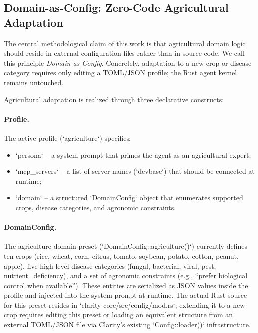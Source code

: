 \documentclass[11pt,a4paper]{article}
\begin{document}
\subsection{Domain-as-Config: Zero-Code Agricultural Adaptation}

The central methodological claim of this work is that agricultural domain logic should reside in external configuration files rather than in source code. We call this principle \textit{Domain-as-Config}. Concretely, adaptation to a new crop or disease category requires only editing a TOML/JSON profile; the Rust agent kernel remains untouched.

Agricultural adaptation is realized through three declarative constructs:

\paragraph{Profile.} The active profile (`agriculture`) specifies:
\begin{itemize}[leftmargin=*]
    \item `persona` -- a system prompt that primes the agent as an agricultural expert;
    \item `mcp\_servers` -- a list of server names (`devbase`) that should be connected at runtime;
    \item `domain` -- a structured `DomainConfig` object that enumerates supported crops, disease categories, and agronomic constraints.
\end{itemize}

\paragraph{DomainConfig.} The agriculture domain preset (`DomainConfig::agriculture()`) currently defines ten crops (rice, wheat, corn, citrus, tomato, soybean, potato, cotton, peanut, apple), five high-level disease categories (fungal, bacterial, viral, pest, nutrient\_deficiency), and a set of agronomic constraints (e.g., ``prefer biological control when available''). These entities are serialized as JSON values inside the profile and injected into the system prompt at runtime. The actual Rust source for this preset resides in `clarity-core/src/config/mod.rs`; extending it to a new crop requires editing this preset or loading an equivalent structure from an external TOML/JSON file via Clarity's existing `Config::loader()` infrastructure.
\end{document}
